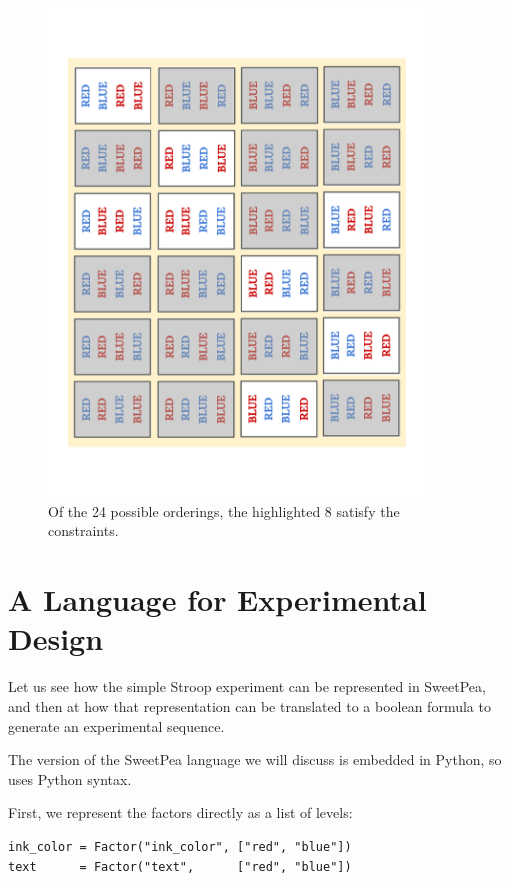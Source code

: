 \begin{figure}[t]
    \centerline{\includegraphics[angle=270,origin=c,width=10cm]{fig_valid_seqs}}
    \caption{Of the 24 possible orderings, the highlighted 8 satisfy the constraints.}%
    \label{fig:valid_seqs}%
\end{figure}


\section{A Language for Experimental Design}

Let us see how the simple Stroop experiment can be represented in SweetPea, and then at how that representation can be translated to a boolean formula to generate an experimental sequence.

The version of the SweetPea language we will discuss is embedded in Python, so uses Python syntax.

First, we represent the factors directly as a list of levels:

\begin{verbatim}
ink_color = Factor("ink_color", ["red", "blue"])
text      = Factor("text",      ["red", "blue"])
\end{verbatim}

